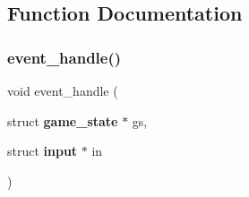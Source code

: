 \subsection{Function Documentation}
\mbox{\label{event_8c_adaffdf4317dd1674648a10c44f428ea0}} 
\subsubsection{event\+\_\+handle()}
{\footnotesize\ttfamily void event\+\_\+handle (\begin{DoxyParamCaption}\item[{struct \textbf{ game\+\_\+state} $\ast$}]{gs,  }\item[{struct \textbf{ input} $\ast$}]{in }\end{DoxyParamCaption})}

